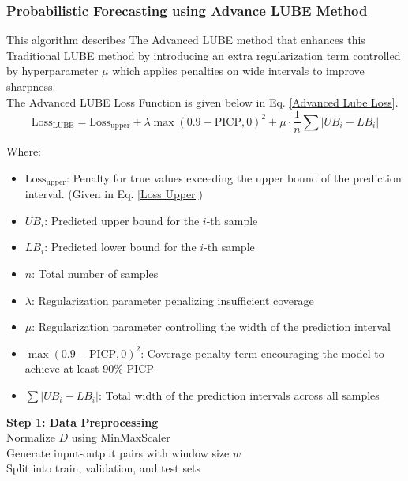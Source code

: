 \begin{itemize}
    \subsubsection{Probabilistic Forecasting using Advance LUBE Method}
        This algorithm describes The Advanced LUBE method that enhances this Traditional LUBE method by introducing an extra regularization term controlled by hyperparameter $\mu$ which applies penalties on wide intervals to improve sharpness.\\
        The Advanced LUBE Loss Function is given below in Eq. \eqref{Advanced Lube Loss}.
        \begin{equation}
            \text{Loss}_{\text{LUBE}} = \text{Loss}_{\text{upper}} + \lambda \max(0.9 - \text{PICP}, 0)^2 + \mu \cdot \frac{1}{n} \sum |UB_i - LB_i|
        \label{Advanced Lube Loss}
        \end{equation}

        Where:
        \begin{itemize}
        \item $\text{Loss}_{\text{upper}}$: Penalty for true values exceeding the upper bound of the prediction interval. (Given in Eq. \eqref{Loss Upper})
        \item $UB_i$: Predicted upper bound for the $i$-th sample
        \item $LB_i$: Predicted lower bound for the $i$-th sample
        \item $n$: Total number of samples
        \item $\lambda$: Regularization parameter penalizing insufficient coverage
        \item $\mu$: Regularization parameter controlling the width of the prediction interval
        \item $\max(0.9 - \text{PICP}, 0)^2$: Coverage penalty term encouraging the model to achieve at least 90\% PICP
        \item $\sum |UB_i - LB_i|$: Total width of the prediction intervals across all samples
        \end{itemize}


        \begin{algorithm}[H]
        \footnotesize
        \SetAlgoCaptionSeparator{:}
    
    
        \textbf{Step 1: Data Preprocessing}\\
        Normalize $D$ using MinMaxScaler\\
        Generate input-output pairs with window size $w$\\
        Split into train, validation, and test sets
    

\end{algorithm}
\end{itemize}
